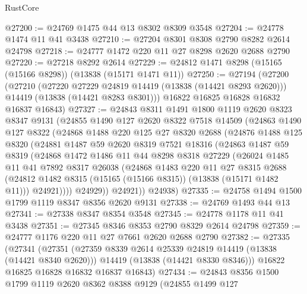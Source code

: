 \begin{lexlean}{RustCore}
\begin{coremodule}
@27200 := @24769 @1475 @44 @13 @8302 @8309 @3548
@27204 := @24778 @1474 @11 @41 @3438
@27210 := @27204 @8301 @8308 @2790 @8282 @2614 @24798
@27218 := @24777 @1472 @220 @11 @27 @8298 @2620 @2688 @2790
@27220 := @27218 @8292 @2614
@27229 := @24812 @1471 @8298 (@15165 (@15166 @8298)) (@13838 (@15171 @1471 @11))
@27250 := @27194
    (@27200
      (@27210
        (@27220 @27229 @24819 @14419 (@13838 (@14421 @8293 @2620)))
        @14419
        (@13838 (@14421 @8283 @8301)))
      @16822
      @16825
      @16828
      @16832
      @16837
      @16843)
@27327 := @24843
    @8311
    @1491
    @1800
    @1119
    @2620
    @8323
    @8347
    @9131
    (@24855
      @1490
      @127
      @2620
      @8322
      @7518
      @14509
      (@24863
        @1490
        @127
        @8322
        (@24868
          @1488
          @220
          @125
          @27
          @8320
          @2688
          (@24876
            @1488
            @125
            @8320
            (@24881
              @1487
              @59
              @2620
              @8319
              @7521
              @18316
              (@24863
                @1487
                @59
                @8319
                (@24868
                  @1472
                  @1486
                  @11
                  @44
                  @8298
                  @8318
                  @27229
                  (@26024
                    @1485
                    @11
                    @41
                    @7892
                    @8317
                    @26038
                    (@24868
                      @1483
                      @220
                      @11
                      @27
                      @8315
                      @2688
                      (@24812 @1482 @8315 (@15165 (@15166 @8315)) (@13838 (@15171 @1482 @11)))
                      @24921))))
              @24929))
          @24921))
      @24938)
@27335 := @24758 @1494 @1500 @1799 @1119 @8347 @8356 @2620 @9131
@27338 := @24769 @1493 @44 @13
@27341 := @27338 @8347 @8354 @3548
@27345 := @24778 @1178 @11 @41 @3438
@27351 := @27345 @8346 @8353 @2790 @8329 @2614 @24798
@27359 := @24777 @1176 @220 @11 @27 @7661 @2620 @2688 @2790
@27382 := @27335
    (@27341
      (@27351
        (@27359 @8339 @2614 @25339 @24819 @14419 (@13838 (@14421 @8340 @2620)))
        @14419
        (@13838 (@14421 @8330 @8346)))
      @16822
      @16825
      @16828
      @16832
      @16837
      @16843)
@27434 := @24843
    @8356
    @1500
    @1799
    @1119
    @2620
    @8362
    @8388
    @9129
    (@24855
      @1499
      @127

\end{coremodule}
\end{lexlean}
